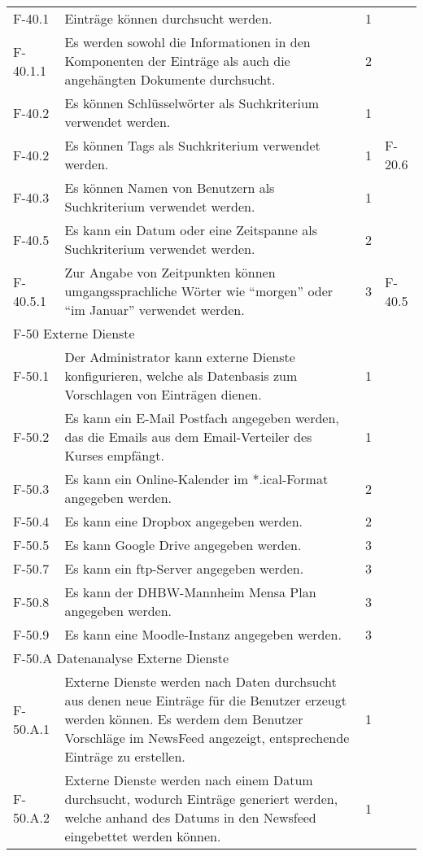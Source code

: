 \begin{tabularx}{\textwidth}{|l|X|l|l|}
    \hline
    F-40.1 & Einträge können durchsucht werden. & 1 &\\
    F-40.1.1 & Es werden sowohl die Informationen in den Komponenten der Einträge als auch die angehängten Dokumente durchsucht. & 2 & \\
    F-40.2 & Es können Schlüsselwörter als Suchkriterium verwendet werden. & 1 &\\
    F-40.2 & Es können Tags als Suchkriterium verwendet werden. & 1 & F-20.6\\
    F-40.3 & Es können Namen von Benutzern als Suchkriterium verwendet werden. & 1 & \\
    F-40.5 & Es kann ein Datum oder eine Zeitspanne als Suchkriterium verwendet werden. & 2 & \\
    F-40.5.1 & Zur Angabe von Zeitpunkten können umgangssprachliche Wörter wie \enquote{morgen} oder \enquote{im Januar} verwendet werden. & 3 & F-40.5\\
    \hline
    \multicolumn{4}{|l|}{F-50 Externe Dienste}\\
    \hline
    F-50.1 & Der Administrator kann externe Dienste konfigurieren, welche als Datenbasis zum Vorschlagen von Einträgen dienen. & 1 & \\
    F-50.2 & Es kann ein E-Mail Postfach angegeben werden, das die Emails aus dem Email-Verteiler des Kurses empfängt. & 1 & \\
    F-50.3 & Es kann ein Online-Kalender im *.ical-Format angegeben werden. & 2 & \\
    F-50.4 & Es kann eine Dropbox angegeben werden. & 2 & \\
    F-50.5 & Es kann Google Drive angegeben werden. & 3 & \\
    F-50.7 & Es kann ein ftp-Server angegeben werden. & 3 & \\
    F-50.8 & Es kann der DHBW-Mannheim Mensa Plan angegeben werden. & 3 & \\
    F-50.9 & Es kann eine Moodle-Instanz angegeben werden.&3&\\
    \hline
    \multicolumn{4}{|l|}{F-50.A Datenanalyse Externe Dienste}\\
    \hline
    F-50.A.1 & Externe Dienste werden nach Daten durchsucht aus denen neue Einträge für die Benutzer erzeugt werden können. Es werdem dem Benutzer Vorschläge im NewsFeed angezeigt, entsprechende Einträge zu erstellen. & 1 & \\
    F-50.A.2 & Externe Dienste werden nach einem Datum durchsucht, wodurch Einträge generiert werden, welche anhand des Datums in den Newsfeed eingebettet werden können. & 1 & \\

\end{tabularx}
